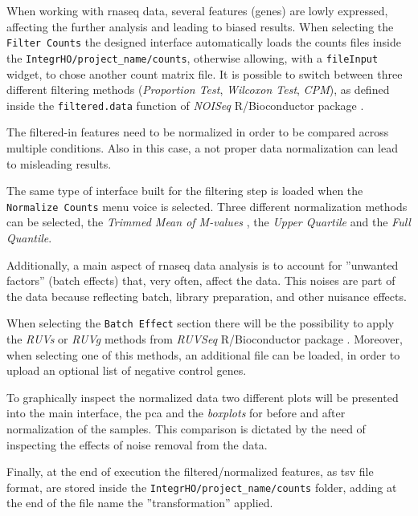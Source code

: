 
When working with \gls{rnaseq} data, several features (genes) are lowly expressed, affecting the further analysis and leading to biased results.
When selecting the \lstinline!Filter Counts! the designed interface automatically loads the counts files inside the \lstinline!IntegrHO/project_name/counts!, otherwise allowing, with a \lstinline!fileInput! widget, to chose another count matrix file.
It is possible to switch between three different filtering methods (\textit{Proportion Test}, \textit{Wilcoxon Test}, \textit{CPM}), as defined inside the \lstinline!filtered.data! function of \textit{NOISeq} R/Bioconductor package \cite{Tarazona2011, Tarazona2015}.

The filtered-in features need to be normalized in order to be compared across multiple conditions.
Also in this case, a not proper data normalization can lead to misleading results.

The same type of interface built for the filtering step is loaded when the \lstinline!Normalize Counts! menu voice is selected.
Three different normalization methods can be selected, the \textit{Trimmed Mean of M-values} \cite{Robinson2010}, the \textit{Upper Quartile} and the \textit{Full Quantile}.

Additionally, a main aspect of \gls{rnaseq} data analysis is to account for ''unwanted factors'' (batch effects) that, very often, affect the data.
This noises are part of the data because reflecting batch, library preparation, and other nuisance effects.

When selecting the \lstinline!Batch Effect! section there will be the possibility to apply the \textit{RUVs} or \textit{RUVg} methods from \textit{RUVSeq} R/Bioconductor package \cite{Risso2014h}.
Moreover, when selecting one of this methods, an additional file can be loaded, in order to upload an optional list of negative control genes.

To graphically inspect the normalized data two different plots will be presented into the main interface, the \gls{pca} and the \textit{boxplots} for before and after normalization of the samples.
This comparison is dictated by the need of inspecting the effects of noise removal from the data.

Finally, at the end of execution the filtered/normalized features, as \gls{tsv} file format, are stored inside the \lstinline!IntegrHO/project_name/counts! folder, adding at the end of the file name the ''transformation'' applied.


